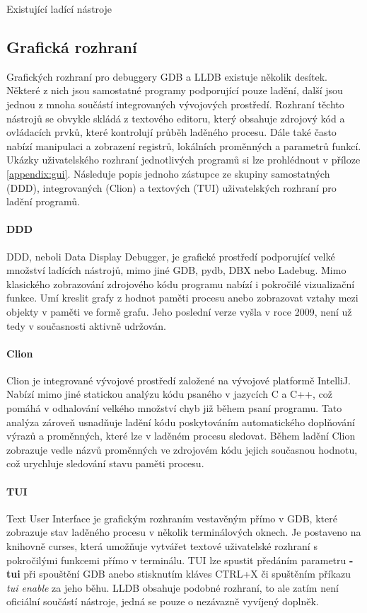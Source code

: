 \documentclass[czech,bachelor,male,python,dept460]{diploma}						%
\begin{document}
\begin{section}{Existující ladící nástroje}
	\subsection{Grafická rozhraní}
		Grafických rozhraní pro debuggery GDB a LLDB existuje několik desítek. Některé z nich jsou samostatné programy podporující pouze ladění, další jsou
		jednou z mnoha součástí integrovaných vývojových prostředí. Rozhraní těchto nástrojů se obvykle skládá z textového editoru, který obsahuje zdrojový kód a
		ovládacích prvků, které kontrolují průběh laděného procesu. Dále také často nabízí manipulaci a zobrazení registrů, lokálních proměnných a parametrů
		funkcí. Ukázky uživatelského rozhraní jednotlivých programů si lze prohlédnout v příloze \ref{appendix:gui}. Následuje popis jednoho zástupce
		ze skupiny samostatných (DDD), integrovaných (Clion) a textových (TUI) uživatelských rozhraní pro ladění programů.
		\paragraph*{DDD}
			DDD, neboli Data Display Debugger, je grafické prostředí podporující velké množství ladících nástrojů, mimo jiné GDB, pydb, DBX nebo Ladebug.
			Mimo klasického zobrazování zdrojového kódu programu nabízí i pokročilé vizualizační funkce. Umí kreslit grafy z hodnot paměti procesu
			anebo zobrazovat vztahy mezi objekty v paměti ve formě grafu. Jeho poslední verze vyšla v roce 2009, není už tedy v současnosti aktivně udržován.
		\paragraph*{Clion}
		\label{ref:clion}
			Clion je integrované vývojové prostředí založené na vývojové platformě IntelliJ. Nabízí mimo jiné statickou analýzu kódu psaného v jazycích
			C a C++, což pomáhá v odhalování velkého množství chyb již během psaní programu. Tato analýza zároveň usnadňuje ladění kódu poskytováním
			automatického doplňování výrazů a proměnných, které lze v laděném procesu sledovat. Během ladění Clion zobrazuje vedle názvů proměnných
			ve zdrojovém kódu jejich současnou hodnotu, což urychluje sledování stavu paměti procesu.
		\paragraph*{TUI}
			Text User Interface je grafickým rozhraním vestavěným přímo v GDB, které zobrazuje stav laděného procesu v několik terminálových oknech.
			Je postaveno na knihovně curses, která umožňuje vytvářet textové uživatelské rozhraní s pokročilými funkcemi přímo v terminálu.
			TUI lze spustit předáním parametru \textbf{-tui} při spouštění GDB anebo stisknutím kláves CTRL+X či spuštěním příkazu \emph{tui enable} za jeho běhu.
			LLDB obsahuje podobné rozhraní, to ale zatím není oficiální součástí nástroje, jedná se pouze o nezávazně vyvíjený doplněk.
\end{section}
\end{document}
